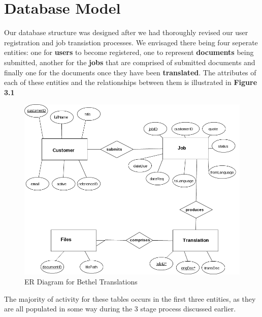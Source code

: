 \documentclass{l3proj}
\begin{document}


\section{Database Model}

Our database structure was designed after we had thoroughly revised our user registration and job transistion processes. We envisaged there being four seperate entities: one for \textbf{users} to become registered, one to represent \textbf{documents} being submitted, another for the \textbf{jobs} that are comprised of submitted documents and finally one for the documents once they have been \textbf{translated}. The attributes of each of these entities and the relationships between them is illustrated in \textbf{Figure 3.1} 

\begin{figure}
\begin{center}
\includegraphics[width=\linewidth]{bt-dbstruct}
\caption{ER Diagram for Bethel Translations}
\end{center}
\end{figure}

The majority of activity for these tables occurs in the first three entities, as they are all populated in some way during the 3 stage process discussed earlier.
\end{document}
